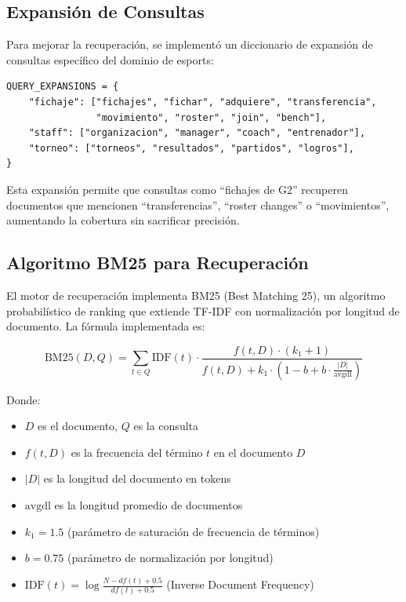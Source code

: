 \subsection{Expansión de Consultas}

Para mejorar la recuperación, se implementó un diccionario de expansión de consultas específico del dominio de esports:

\begin{verbatim}
QUERY_EXPANSIONS = {
    "fichaje": ["fichajes", "fichar", "adquiere", "transferencia", 
                "movimiento", "roster", "join", "bench"],
    "staff": ["organizacion", "manager", "coach", "entrenador"],
    "torneo": ["torneos", "resultados", "partidos", "logros"],
}
\end{verbatim}

Esta expansión permite que consultas como ``fichajes de G2'' recuperen documentos que mencionen ``transferencias'', ``roster changes'' o ``movimientos'', aumentando la cobertura sin sacrificar precisión.

\subsection{Algoritmo BM25 para Recuperación}

El motor de recuperación implementa BM25 (Best Matching 25), un algoritmo probabilístico de ranking que extiende TF-IDF con normalización por longitud de documento. La fórmula implementada es:

\[
\mathrm{BM25}(D, Q) = \sum_{t \in Q} \mathrm{IDF}(t) \cdot \frac{f(t, D) \cdot (k_1 + 1)}{f(t, D) + k_1 \cdot (1 - b + b \cdot \frac{|D|}{\mathrm{avgdl}})}
\]

Donde:
\begin{itemize}
    \item $D$ es el documento, $Q$ es la consulta
    \item $f(t, D)$ es la frecuencia del término $t$ en el documento $D$
    \item $|D|$ es la longitud del documento en tokens
    \item $\mathrm{avgdl}$ es la longitud promedio de documentos
    \item $k_1 = 1.5$ (parámetro de saturación de frecuencia de términos)
    \item $b = 0.75$ (parámetro de normalización por longitud)
    \item $\mathrm{IDF}(t) = \log \frac{N - df(t) + 0.5}{df(t) + 0.5}$ (Inverse Document Frequency)
\end{itemize}

